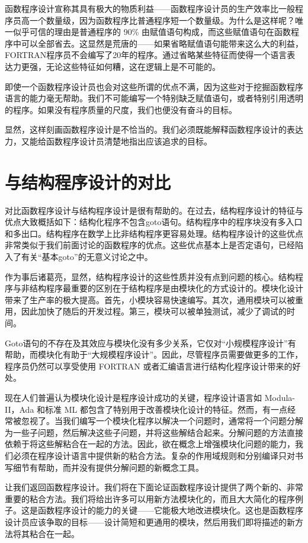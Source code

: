 \documentclass[12pt]{article}
\begin{document}
函数程序设计宣称其具有极大的物质利益——函数程序设计员的生产效率比一般程序员高一个数量级，因为函数程序比普通程序短一个数量级。为什么是这样呢？唯一似乎可信的理由是普通程序的 90\% 由赋值语句构成，而这些赋值语句在函数程序中可以全部省去。这显然是荒唐的——如果省略赋值语句能带来这么大的利益，FORTRAN程序员不会编写了20年的程序。通过省略某些特征而使得一个语言表达力更强，无论这些特征如何糟，这在逻辑上是不可能的。

即使一个函数程序设计员也会对这些所谓的优点不满，因为这些对于挖掘函数程序语言的能力毫无帮助。我们不可能编写一个特别缺乏赋值语句，或者特别引用透明的程序。如果没有程序质量的尺度，我们也便没有奋斗的目标。

显然，这样刻画函数程序设计是不恰当的。我们必须既能解释函数程序设计的表达力，又能给函数程序设计员清楚地指出应该追求的目标。

\section{与结构程序设计的对比}

对比函数程序设计与结构程序设计是很有帮助的。在过去，结构程序设计的特征与优点大致概括如下：结构化程序不包含goto语句。结构程序中的程序块没有多入口和多出口。结构程序在数学上比非结构程序更容易处理。结构程序设计的这些优点非常类似于我们前面讨论的函数程序的优点。这些优点基本上是否定语句，已经陷入了有关``基本goto''的无意义讨论之中。

作为事后诸葛亮，显然，结构程序设计的这些性质并没有点到问题的核心。结构程序与非结构程序最重要的区别在于结构程序是由模块化的方式设计的。模块化设计带来了生产率的极大提高。首先，小模块容易快速编写。其次，通用模块可以被重用，因此加快了随后的开发过程。第三，模块可以被单独测试，减少了调试的时间。

Goto语句的不存在及其效应与模块化没有多少关系，它仅对``小规模程序设计''有帮助，而模块化有助于``大规模程序设计''。因此，尽管程序员需要做更多的工作，程序员仍然可以享受使用 FORTRAN 或者汇编语言进行结构化程序设计带来的好处。

现在人们普遍认为模块化设计是程序设计成功的关键，程序设计语言如 Modula-II\cite[Wir82]{Wir82}，Ada\cite[oD80]{oD80} 和标准 ML 都包含了特别用于改善模块化设计的特征。然而，有一点经常被忽视了。当我们编写一个模块化程序以解决一个问题时，通常将一个问题分解为一些子问题，然后解决这些子问题，并将这些解结合起来。分解问题的方法直接依赖于将这些解粘合在一起的方法。因此，欲在概念上增强模块化问题的能力，我们必须在程序设计语言中提供新的粘合方法。复杂的作用域规则和分别编译只对书写细节有帮助，而并没有提供分解问题的新概念工具。

让我们返回函数程序设计。我们将在下面论证函数程序设计提供了两个新的、非常重要的粘合方法。我们将给出许多可以用新方法模块化的，而且大大简化的程序例子。这是函数程序设计的能力的关键——它能极大地改进模块化。这也是函数程序设计员应该争取的目标——设计简短和更通用的模块，然后用我们即将描述的新方法将其粘合在一起。
\end{document}
